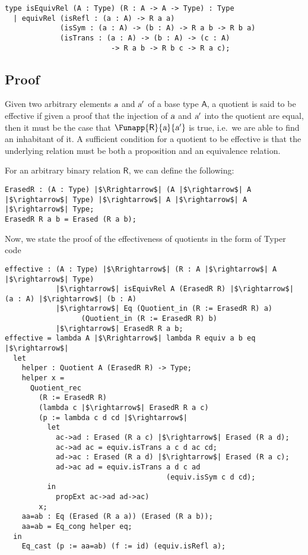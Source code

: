 \documentclass[11pt]{article}
\newcommand\kw[1] {\textsf{#1}}
\newcommand\id[1] {\textsl{#1}}
\begin{document}
\begin{verbatim}
type isEquivRel (A : Type) (R : A -> A -> Type) : Type
  | equivRel (isRefl : (a : A) -> R a a)
             (isSym : (a : A) -> (b : A) -> R a b -> R b a)
             (isTrans : (a : A) -> (b : A) -> (c : A)
                         -> R a b -> R b c -> R a c);
\end{verbatim}

\subsection{Proof}
Given two arbitrary elements $\id{a}$ and $\id{a}'$ of a base type $\kw{A}$, a quotient is said to be effective if given a proof that the injection of $\id{a}$ and $\id{a}'$ into the quotient are equal, then it must be the case that $\Funapp{\kw{R}}{\id{a}}{\id{a}'}$ is true, i.e.\ we are able to find an inhabitant of it. A sufficient condition for a quotient to be effective is that the underlying relation must be both a proposition and an equivalence relation.


For an arbitrary binary relation $\kw{R}$, we can define the following:

\begin{verbatim}
ErasedR : (A : Type) |$\Rrightarrow$| (A |$\rightarrow$| A |$\rightarrow$| Type) |$\rightarrow$| A |$\rightarrow$| A |$\rightarrow$| Type;
ErasedR R a b = Erased (R a b);
\end{verbatim}

Now, we state the proof of the effectiveness of quotients in the form of Typer code

\begin{verbatim}
effective : (A : Type) |$\Rrightarrow$| (R : A |$\rightarrow$| A |$\rightarrow$| Type)
            |$\rightarrow$| isEquivRel A (ErasedR R) |$\rightarrow$| (a : A) |$\rightarrow$| (b : A)
            |$\rightarrow$| Eq (Quotient_in (R := ErasedR R) a)
                  (Quotient_in (R := ErasedR R) b)
            |$\rightarrow$| ErasedR R a b;
effective = lambda A |$\Rrightarrow$| lambda R equiv a b eq |$\rightarrow$|
  let
    helper : Quotient A (ErasedR R) -> Type;
    helper x =
      Quotient_rec
        (R := ErasedR R)
        (lambda c |$\rightarrow$| ErasedR R a c)
        (p := lambda c d cd |$\rightarrow$|
          let
            ac->ad : Erased (R a c) |$\rightarrow$| Erased (R a d);
            ac->ad ac = equiv.isTrans a c d ac cd;
            ad->ac : Erased (R a d) |$\rightarrow$| Erased (R a c);
            ad->ac ad = equiv.isTrans a d c ad
                                      (equiv.isSym c d cd);
          in
            propExt ac->ad ad->ac)
        x;
    aa=ab : Eq (Erased (R a a)) (Erased (R a b));
    aa=ab = Eq_cong helper eq;
  in
    Eq_cast (p := aa=ab) (f := id) (equiv.isRefl a);
\end{verbatim}
\end{document}
